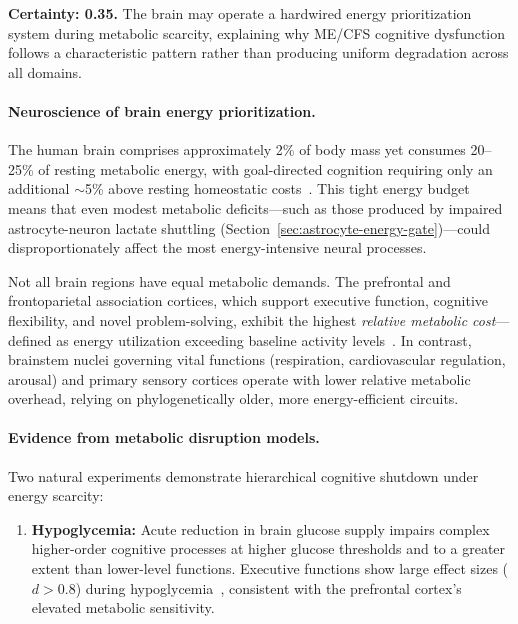\begin{speculation}
\label{spec:cns-energy-triage}
\textbf{Certainty: 0.35.} The brain may operate a hardwired energy prioritization system during metabolic scarcity, explaining why ME/CFS cognitive dysfunction follows a characteristic pattern rather than producing uniform degradation across all domains.

\paragraph{Neuroscience of brain energy prioritization.}
The human brain comprises approximately 2\% of body mass yet consumes 20--25\% of resting metabolic energy, with goal-directed cognition requiring only an additional $\sim$5\% above resting homeostatic costs~\cite{Jamadar2025metabolic}. This tight energy budget means that even modest metabolic deficits---such as those produced by impaired astrocyte-neuron lactate shuttling (Section~\ref{sec:astrocyte-energy-gate})---could disproportionately affect the most energy-intensive neural processes.

Not all brain regions have equal metabolic demands. The prefrontal and frontoparietal association cortices, which support executive function, cognitive flexibility, and novel problem-solving, exhibit the highest \emph{relative metabolic cost}---defined as energy utilization exceeding baseline activity levels~\cite{Jamadar2025metabolic}. In contrast, brainstem nuclei governing vital functions (respiration, cardiovascular regulation, arousal) and primary sensory cortices operate with lower relative metabolic overhead, relying on phylogenetically older, more energy-efficient circuits.

\paragraph{Evidence from metabolic disruption models.}
Two natural experiments demonstrate hierarchical cognitive shutdown under energy scarcity:

\begin{enumerate}
    \item \textbf{Hypoglycemia:} Acute reduction in brain glucose supply impairs complex higher-order cognitive processes at higher glucose thresholds and to a greater extent than lower-level functions. Executive functions show large effect sizes ($d > 0.8$) during hypoglycemia~\cite{Graveling2013hypoglycemia}, consistent with the prefrontal cortex's elevated metabolic sensitivity.


\end{enumerate}
\end{speculation}
